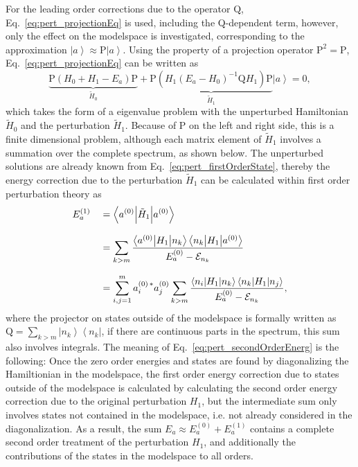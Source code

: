 For the leading order corrections due to the operator $\text{Q}$, Eq.~\eqref{eq:pert_projectionEq} is used, including the Q-dependent term, however, only the effect on the modelspace is investigated, corresponding to the approximation $\left|a\right> \approx \text{P}\left|a\right>$. Using the property of a projection operator $\text{P}^2=\text{P}$, Eq.~\eqref{eq:pert_projectionEq} can be written as
\begin{equation}
\label{eq:pert_secondOrder}
 \underbrace{\text{P}(H_0+H_1-E_a)\text{P}}_{\tilde{H}_0} + \underbrace{\text{P}(H_1(E_a-H_0)^{-1}\text{Q}H_1)\text{P}}_{\tilde{H}_1} \left|a\right> = 0,
\end{equation}
which takes the form of a eigenvalue problem with the unperturbed Hamiltonian $\tilde{H}_0$ and the perturbation $\tilde{H}_1$. Because of $\text{P}$ on the left and right side, this is a finite dimensional problem, although each matrix element of $\tilde{H}_1$ involves a summation over the complete spectrum, as shown below. The unperturbed solutions are already known from Eq.~\eqref{eq:pert_firstOrderState}, thereby the energy correction due to the perturbation $\tilde{H}_1$ can be calculated within first order perturbation theory as
\begin{alignat}{2}
\label{eq:pert_secondOrderEnerg}
&E_a^{(1)}&&= \left<a^{(0)} \middle| \tilde{H}_1 \middle| a^{(0)} \right>\\[7.5pt]
& &&= \sum_{k>m} \frac{\left<a^{(0)}\middle|H_1\middle|n_k\right>\left<n_k\middle|H_1\middle|a^{(0)}\right>}{E_a^{(0)}-\mathcal{E}_{n_k}}\\[7.5pt]
& &&= \sum_{i,j=1}^m a_i^{(0)\,*}a_j^{(0)} \sum_{k>m} \frac{\left<n_i\middle|H_1\middle|n_k\right>\left<n_k\middle|H_1\middle|n_j\right>}{E_a^{(0)}-\mathcal{E}_{n_k}}\notag,
\end{alignat}
where the projector on states outside of the modelspace is formally written as $\text{Q}=\sum_{k>m}\left|n_k\right>\left<n_k\right|$, if there are continuous parts in the spectrum, this sum also involves integrals. The meaning of Eq.~\eqref{eq:pert_secondOrderEnerg} is the following: Once the zero order energies and states are found by diagonalizing the Hamiltionian in the modelspace, the first order energy correction due to states outside of the modelspace is calculated by calculating the second order energy correction due to the original perturbation $H_1$, but the intermediate sum only involves states not contained in the modelspace, i.e. not already considered in the diagonalization. As a result, the sum $E_a\approx E_a^{(0)}+E_a^{(1)}$ contains a complete second order treatment of the perturbation $H_1$, and additionally the contributions of the states in the modelspace to all orders.

